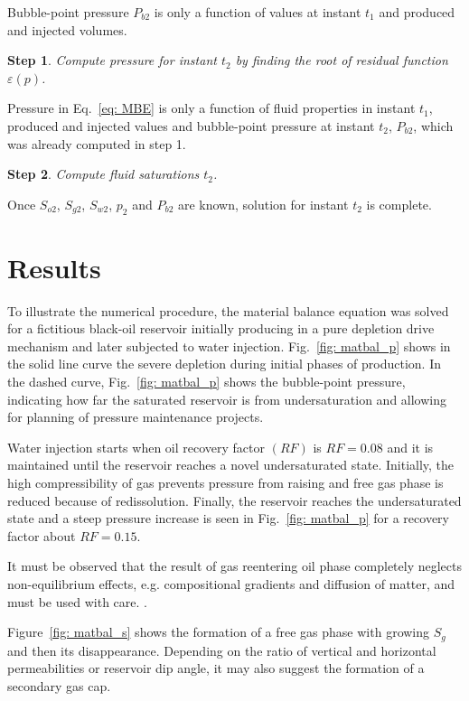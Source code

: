\documentclass[authoryear,preprint,review,11pt]{elsarticle}
\newtheorem{step}{Step}
\begin{document}
Bubble-point pressure $P_{b2}$ is only a function of values at instant $t_1$ and produced and injected volumes.

\begin{step}
Compute pressure for instant $t_2$ by finding the root of residual function $\varepsilon \left(p\right)$.
\end{step}

Pressure in Eq.~\eqref{eq: MBE} is only a function of fluid properties in instant $t_1$, produced and injected values and bubble-point pressure at instant $t_2$, $P_{b2}$, which was already computed in step 1.

\begin{step}
Compute fluid saturations $t_2$.
\end{step}

Once $S_{o2}$, $S_{g2}$, $S_{w2}$, $p_2$ and $P_{b2}$ are known, solution for instant $t_2$ is complete.

\section{Results}
To illustrate the numerical procedure, the material balance equation was solved for a fictitious black-oil reservoir initially producing in a pure depletion drive mechanism and later subjected to water injection. Fig.~\ref{fig: matbal_p} shows in the solid line curve the severe depletion during initial phases of production. In the dashed curve, Fig.~\ref{fig: matbal_p} shows the bubble-point pressure, indicating how far the saturated reservoir is from undersaturation and allowing for planning of pressure maintenance projects.


Water injection starts when oil recovery factor $(RF)$ is $RF=0.08$ and it is maintained until the reservoir reaches a novel undersaturated state. Initially, the high compressibility of gas prevents pressure from raising and free gas phase is reduced because of redissolution. Finally, the reservoir reaches the undersaturated state and a steep pressure increase is seen in Fig.~\ref{fig: matbal_p} for a recovery factor about $RF=0.15$.

It must be observed that the result of gas reentering oil phase completely neglects non-equilibrium effects, e.g. compositional gradients and diffusion of matter, and must be used with care. .

Figure~\ref{fig: matbal_s} shows the formation of a free gas phase with growing $S_g$ and then its disappearance. Depending on the ratio of vertical and horizontal permeabilities or reservoir dip angle, it may also suggest the formation of a secondary gas cap.
\end{document}
